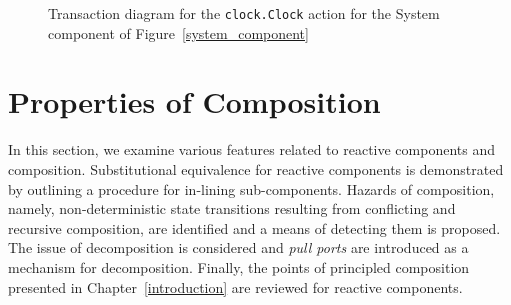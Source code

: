 \begin{figure}
\centering
\cprotect\caption{Transaction diagram for the \verb+clock.Clock+ action for the System component of Figure~\ref{system_component}}
\label{clock_transaction}
\end{figure}

\section{Properties of Composition}
\label{propcomp}
In this section, we examine various features related to reactive components and composition.
Substitutional equivalence for reactive components is demonstrated by outlining a procedure for in-lining sub-components.
Hazards of composition, namely, non-deterministic state transitions resulting from conflicting and recursive composition, are identified and a means of detecting them is proposed.
The issue of decomposition is considered and \emph{pull ports} are introduced as a mechanism for decomposition.
Finally, the points of principled composition presented in Chapter~\ref{introduction} are reviewed for reactive components.

